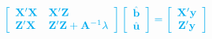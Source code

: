 \documentclass[serif,aspectratio=169]{beamer}
\begin{document}
\begin{frame}
\begin{columns}
\begin{frame}
\begin{columns}
    \pause
    \begin{column}{.6\textwidth}
      $$
      \color{cyan}\left[\begin{array}{ll}
          \mathbf{X}'\mathbf{X} & \mathbf{X}'\mathbf{Z}\\
          \mathbf{Z}'\mathbf{X} & \mathbf{Z}'\mathbf{Z}+\mathbf{A}^{-1}\lambda
        \end{array}\right]
      \left[\begin{array}{cc}
          \hat{\mathbf{b}}\\
          \hat{\mathbf{u}}
        \end{array}\right] = 
      \left[\begin{array}{c}
          \mathbf{X}'\mathbf{y}\\
          \mathbf{Z}'\mathbf{y}
        \end{array}\right]
      $$
    \end{column}
  \end{columns}
\end{frame}



\end{columns}
\end{frame}
\end{document}
